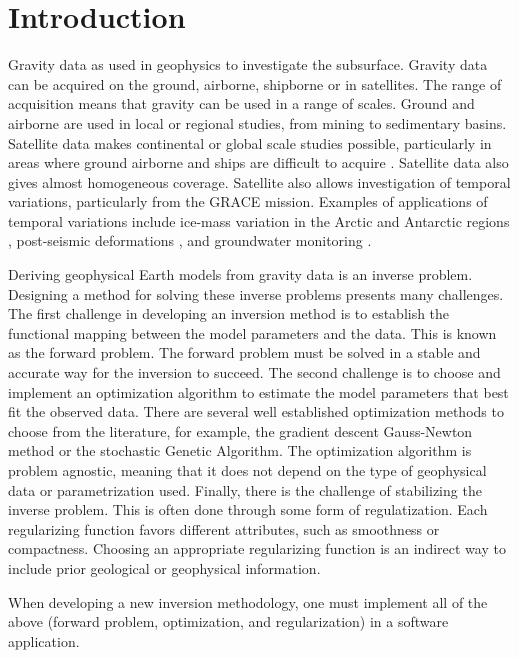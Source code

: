 \chapter{Introduction}


Gravity data as used in geophysics to investigate the subsurface.
Gravity data can be acquired on the ground, airborne, shipborne or in satellites.
The range of acquisition means that gravity can be used in a range of scales.
Ground and airborne are used in local or regional studies, from mining to
sedimentary basins.
Satellite data makes continental or global scale studies possible, particularly
in areas where ground airborne and ships are difficult to acquire
\citep[e.g., ][]{vandermeijde2013, vandermeijde2015, bouman2013,
braitenberg2015, reguzzoni2013}.
Satellite data also gives almost homogeneous coverage.
Satellite also allows investigation of temporal variations, particularly from
the GRACE mission.
Examples of applications of temporal variations include ice-mass variation in
the Arctic and Antarctic regions
\citep{chen2011, ramillien2006},
post-seismic deformations \citep{mikhailov2014},
and groundwater monitoring \citep{humphrey2016}.


Deriving geophysical Earth models from gravity data is an inverse problem.
Designing a method for solving these inverse problems presents many challenges.
The first challenge in developing an inversion method is to establish the
functional mapping between the model parameters and the data.
This is known as the forward problem.
The forward problem must be solved in a stable and accurate way for the
inversion to succeed.
The second challenge is to choose and implement an optimization algorithm to
estimate the model parameters that best fit the observed data.
There are several well established optimization methods to choose from the
literature, for example, the gradient descent Gauss-Newton method or the
stochastic Genetic Algorithm.
The optimization algorithm is problem agnostic, meaning that it does not depend
on the type of geophysical data or parametrization used.
Finally, there is the challenge of stabilizing the inverse problem.
This is often done through some form of regulatization.
Each regularizing function favors different attributes, such as smoothness or
compactness.
Choosing an appropriate regularizing function is an indirect way to include
prior geological or geophysical information.

When developing a new inversion methodology, one must implement all of the
above (forward problem, optimization, and regularization) in a software
application.
